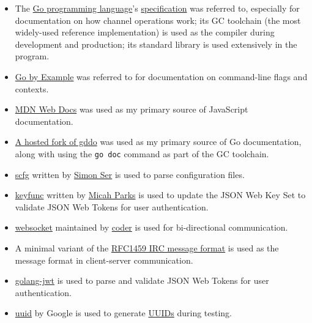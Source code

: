 \begin{itemize}
\item The \href{https://go.dev}{Go programming language}'s
\href{https://go.dev/ref/spec}{specification} was referred to,
especially for documentation on how channel operations work; its GC
toolchain (the most widely-used reference implementation) is used as
the compiler during development and production; its standard library
is used extensively in the program.

\item \href{https://gobyexample.com}{Go by Example} was referred to for
documentation on command-line flags and contexts.

\item \href{https://developer.mozilla.org/en-US/}{MDN Web Docs} was
used as my primary source of JavaScript documentation.

\item \href{https://godocs.io}{A hosted fork of gddo} was used as my
primary source of Go documentation, along with using the
\texttt{go doc} command as part of the GC toolchain.

\item \href{https://git.sr.ht/~emersion/go-scfg}{scfg}
written by \href{https://emersion.fr}{Simon Ser} is used to parse
configuration files.

\item \href{https://github.com/MicahParks/keyfunc}{keyfunc}
written by \href{https://micahparks.com/}{Micah Parks} is used to
update the JSON Web Key Set to validate JSON Web Tokens for user
authentication.

\item \href{https://github.com/coder/websocket}{websocket} maintained
by \href{https://coder.com/}{coder} is used for bi-directional
communication.

\item A minimal variant of the
\href{https://www.rfc-editor.org/rfc/rfc1459#section-2.3}{RFC1459
IRC message format} is used as the message format in client-server
communication.

\item \href{https://github.com/golang-jwt/jwt}{golang-jwt} is used to
parse and validate JSON Web Tokens for user authentication.

\item \href{https://github.com/google/uuid}{uuid} by Google is used to
generate
\href{https://www.rfc-editor.org/rfc/rfc9562.html}{UUIDs}
during testing.


\end{itemize}
